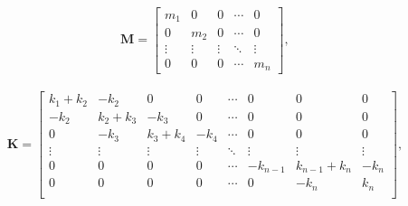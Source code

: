\documentclass{article}
\begin{document}
				\begin{equation*}
					\textbf{M}=
					\begin{bmatrix}
						m_1 & 0 & 0 & \cdots & 0\\
						0 & m_2 & 0 & \cdots & 0\\
						\vdots & \vdots & \vdots & \ddots & \vdots \\
						0 & 0 & 0 & \cdots & m_n
					\end{bmatrix},\ \ 
				\end{equation*} \\

				\begin{equation*}
					\textbf{K}=
					\begin{bmatrix}
						k_1 + k_2 & -k_2 & 0 & 0 & \cdots & 0 & 0 & 0\\
						-k_2 & k_2 + k_3 & -k_3 & 0 & \cdots & 0 & 0 & 0\\
						0& -k_3 & k_3 + k_4 & -k_4 & \cdots & 0 & 0 & 0\\
						\vdots & \vdots & \vdots & \vdots & \ddots & \vdots & \vdots & \vdots \\
						0& 0 & 0 & 0 & \cdots & -k_{n-1} & k_{n-1}+k_{n} & -k_{n}\\
						0& 0 & 0 & 0 & \cdots & 0 & -k_{n} & k_{n}\\
					\end{bmatrix},\ \ 
				\end{equation*}\\
\end{document}
